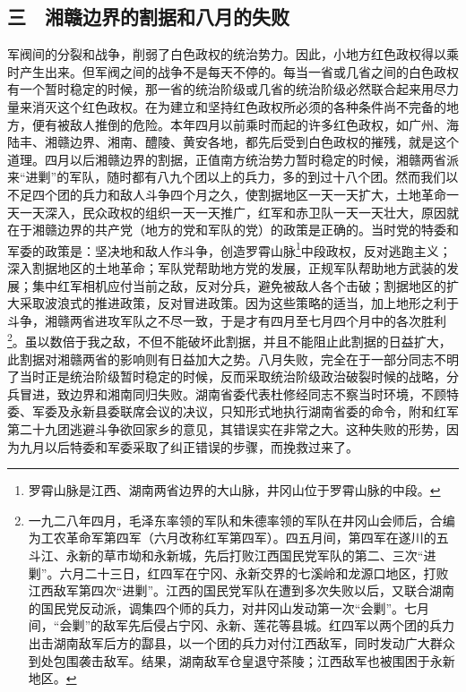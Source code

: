 \documentclass[cn,11pt,chinese]{elegantbook}
\def\myformat#1{\hfil\hfil #1}
\begin{document}
\subsection*{\myformat{三　湘赣边界的割据和八月的失败}}
军阀间的分裂和战争，削弱了白色政权的统治势力。因此，小地方红色政权得以乘时产生出来。但军阀之间的战争不是每天不停的。每当一省或几省之间的白色政权有一个暂时稳定的时候，那一省的统治阶级或几省的统治阶级必然联合起来用尽力量来消灭这个红色政权。在为建立和坚持红色政权所必须的各种条件尚不完备的地方，便有被敌人推倒的危险。本年四月以前乘时而起的许多红色政权，如广州、海陆丰、湘赣边界、湘南、醴陵、黄安各地，都先后受到白色政权的摧残，就是这个道理。四月以后湘赣边界的割据，正值南方统治势力暂时稳定的时候，湘赣两省派来“进剿”的军队，随时都有八九个团以上的兵力，多的到过十八个团。然而我们以不足四个团的兵力和敌人斗争四个月之久，使割据地区一天一天扩大，土地革命一天一天深入，民众政权的组织一天一天推广，红军和赤卫队一天一天壮大，原因就在于湘赣边界的共产党（地方的党和军队的党）的政策是正确的。当时党的特委和军委的政策是：坚决地和敌人作斗争，创造罗霄山脉\footnote[11]{ 罗霄山脉是江西、湖南两省边界的大山脉，井冈山位于罗霄山脉的中段。}中段政权，反对逃跑主义；深入割据地区的土地革命；军队党帮助地方党的发展，正规军队帮助地方武装的发展；集中红军相机应付当前之敌，反对分兵，避免被敌人各个击破；割据地区的扩大采取波浪式的推进政策，反对冒进政策。因为这些策略的适当，加上地形之利于斗争，湘赣两省进攻军队之不尽一致，于是才有四月至七月四个月中的各次胜利\footnote[12]{ 一九二八年四月，毛泽东率领的军队和朱德率领的军队在井冈山会师后，合编为工农革命军第四军（六月改称红军第四军）。四五月间，第四军在遂川的五斗江、永新的草市坳和永新城，先后打败江西国民党军队的第二、三次“进剿”。六月二十三日，红四军在宁冈、永新交界的七溪岭和龙源口地区，打败江西敌军第四次“进剿”。江西的国民党军队在遭到多次失败以后，又联合湖南的国民党反动派，调集四个师的兵力，对井冈山发动第一次“会剿”。七月间，“会剿”的敌军先后侵占宁冈、永新、莲花等县城。红四军以两个团的兵力出击湖南敌军后方的酃县，以一个团的兵力对付江西敌军，同时发动广大群众到处包围袭击敌军。结果，湖南敌军仓皇退守茶陵；江西敌军也被围困于永新地区。}。虽以数倍于我之敌，不但不能破坏此割据，并且不能阻止此割据的日益扩大，此割据对湘赣两省的影响则有日益加大之势。八月失败，完全在于一部分同志不明了当时正是统治阶级暂时稳定的时候，反而采取统治阶级政治破裂时候的战略，分兵冒进，致边界和湘南同归失败。湖南省委代表杜修经同志不察当时环境，不顾特委、军委及永新县委联席会议的决议，只知形式地执行湖南省委的命令，附和红军第二十九团逃避斗争欲回家乡的意见，其错误实在非常之大。这种失败的形势，因为九月以后特委和军委采取了纠正错误的步骤，而挽救过来了。\\
\end{document}
